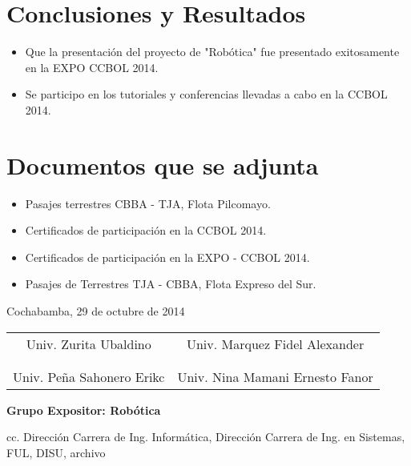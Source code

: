 \documentclass[letterpaper,12pt]{article}
\begin{document}
		\section{Conclusiones y Resultados}

		\begin{itemize}
		
			\item Que la presentaci\'on del proyecto de "Rob\'otica" fue presentado exitosamente en la EXPO CCBOL 2014. 
			\item Se participo en los tutoriales y conferencias llevadas a cabo en la CCBOL 2014.
		\end{itemize}
		
		\section{Documentos que se adjunta}
		
		\begin{itemize}
			\item Pasajes terrestres CBBA - TJA, Flota Pilcomayo.
			\item Certificados de participaci\'on en la CCBOL 2014.
			\item Certificados de participaci\'on en la EXPO - CCBOL 2014.
			\item Pasajes de Terrestres  TJA  - CBBA, Flota Expreso del Sur.
		\end{itemize}
		\vspace{.7cm}		
		\begin{center}
			Cochabamba, 29 de octubre de 2014
		\end{center}
		\vspace{1cm}
		\begin{center}
			\begin{tabular}{cc}
			Univ. Zurita Ubaldino & Univ. Marquez Fidel Alexander \\ 
			 &  \\
			 &  \\
			Univ. Pe\~na Sahonero Erikc &  Univ. Nina Mamani Ernesto Fanor \\
		\end{tabular}				
		
		\end{center}
	
	\vspace{2cm}
	
	\begin{center}
		\textbf{Grupo Expositor: Rob\'otica}
	\end{center}
	
	cc. Direcci\'on Carrera de Ing. Inform\'atica, Direcci\'on Carrera de Ing. en Sistemas, FUL, DISU, archivo
	
\end{document}
